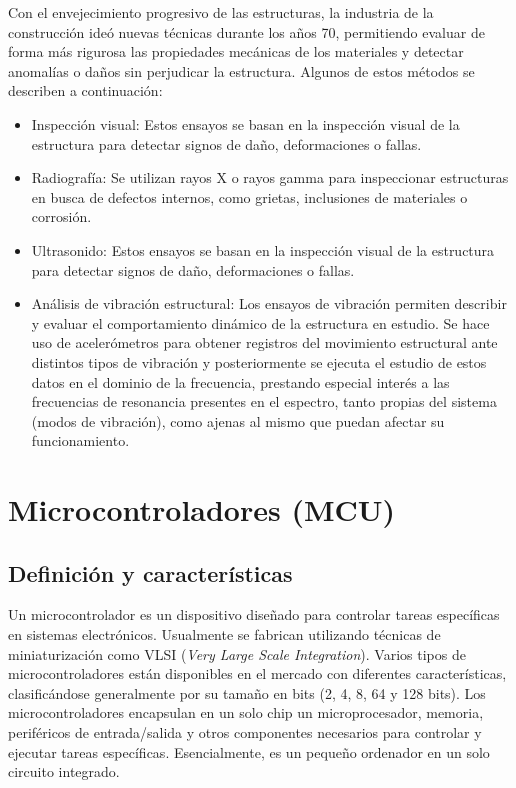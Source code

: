 Con el envejecimiento progresivo de las estructuras, la industria de la construcción ideó nuevas técnicas durante los años 70, permitiendo evaluar de forma más rigurosa las propiedades mecánicas de los materiales y detectar anomalías o daños sin perjudicar la estructura. Algunos de estos métodos se describen a continuación:

\begin{itemize}
    \item{Inspección visual:} Estos ensayos se basan en la inspección visual de la estructura para detectar signos de daño, deformaciones o fallas.

    \item{Radiografía:}  Se utilizan rayos X o rayos gamma para inspeccionar estructuras en busca de defectos internos, como grietas, inclusiones de materiales o corrosión.

    \item{Ultrasonido:} Estos ensayos se basan en la inspección visual de la estructura para detectar signos de daño, deformaciones o fallas.

    \item{Análisis de vibración estructural:} Los ensayos de vibración permiten describir y evaluar el comportamiento dinámico de la estructura en estudio. Se hace uso de acelerómetros para obtener registros del movimiento estructural ante distintos tipos de vibración y posteriormente se ejecuta el estudio de estos datos en el dominio de la frecuencia, prestando especial interés a las frecuencias de resonancia presentes en el espectro, tanto propias del sistema (modos de vibración), como ajenas al mismo que puedan afectar su funcionamiento.
\end{itemize}




\section{Microcontroladores (MCU)}

\subsection{Definición y características}

Un microcontrolador es un dispositivo diseñado para controlar tareas específicas en sistemas electrónicos. Usualmente se fabrican utilizando técnicas de miniaturización como VLSI (\textit{Very Large Scale Integration}). Varios tipos de microcontroladores están disponibles en el mercado con diferentes características, clasificándose generalmente por su tamaño en bits (2, 4, 8, 64 y 128 bits). Los microcontroladores encapsulan en un solo chip un microprocesador, memoria, periféricos de entrada/salida y otros componentes necesarios para controlar y ejecutar tareas específicas. Esencialmente, es un pequeño ordenador en un solo circuito integrado.

